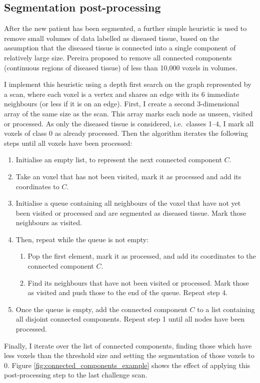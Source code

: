 \documentclass[12pt,a4paper,twoside,openright]{report}
\begin{document}
\subsection{Segmentation post-processing}
After the new patient has been segmented, a further simple heuristic is used to remove small volumes of data labelled as diseased tissue, based on the assumption that the diseased tissue is connected into a single component of relatively large size. Pereira \cite{pereira} proposed to remove all connected components (continuous regions of diseased tissue) of less than 10,000 voxels in volumes.

I implement this heuristic using a depth first search on the graph represented by a scan, where each voxel is a vertex and shares an edge with its 6 immediate neighbours (or less if it is on an edge). First, I create a second 3-dimensional array of the same size as the scan. This array marks each node as unseen, visited or processed. As only the diseased tissue is considered, i.e.\ classes 1--4, I mark all voxels of class 0 as already processed. Then the algorithm iterates the following steps until all voxels have been processed:
\begin{enumerate}
	\item Initialise an empty list, to represent the next connected component $C$.
	\item Take an voxel that has not been visited, mark it as processed and add its coordinates to $C$.
	\item Initialise a queue containing all neighbours of the voxel that have not yet been visited or processed and are segmented as diseased tissue. Mark those neighbours as visited.
	\item Then, repeat while the queue is not empty:
	\begin{enumerate}
		\item Pop the first element, mark it as processed, and add its coordinates to the connected component $C$.
		\item Find its neighbours that have not been visited or processed. Mark those as visited and push those to the end of the queue. Repeat step 4.
	\end{enumerate}
	\item Once the queue is empty, add the connected component $C$ to a list containing all disjoint connected components. Repeat step 1 until all nodes have been processed.
\end{enumerate}
Finally, I iterate over the list of connected components, finding those which have less voxels than the threshold size and setting the segmentation of those voxels to 0. Figure \ref{fig:connected_components_example} shows the effect of applying this post-processing step to the last challenge scan.
\end{document}

